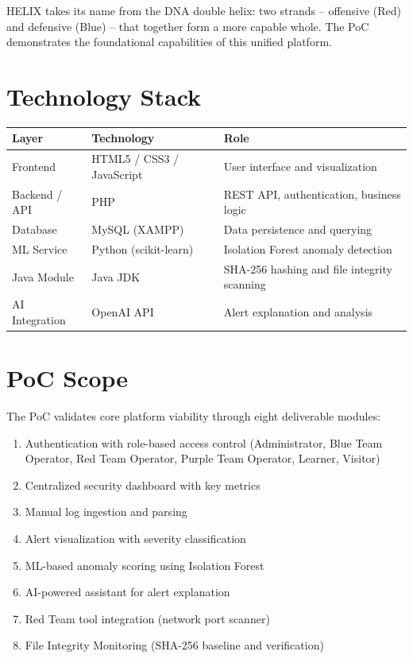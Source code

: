 \documentclass[12pt,a4paper]{report}
\begin{document}
	\vspace{10pt}
	HELIX takes its name from the DNA double helix: two strands -- offensive (Red) and defensive (Blue) -- that together form a more capable whole. The PoC demonstrates the foundational capabilities of this unified platform.
	
	\section{Technology Stack}
	\begin{center}
		\begin{tabular}{L{3.5cm} L{4.5cm} L{5.0cm}}
			\toprule
			\textbf{Layer} & \textbf{Technology} & \textbf{Role} \\
			\midrule
			Frontend & HTML5 / CSS3 / JavaScript & User interface and visualization \\
			Backend / API & PHP & REST API, authentication, business logic \\
			Database & MySQL (XAMPP) & Data persistence and querying \\
			ML Service & Python (scikit-learn) & Isolation Forest anomaly detection \\
 Java Module & Java JDK & SHA-256 hashing and file integrity scanning \\
			AI Integration & OpenAI API & Alert explanation and analysis \\
			\bottomrule
		\end{tabular}
	\end{center}
	
	\section{PoC Scope}
	The PoC validates core platform viability through eight deliverable modules:
	\begin{enumerate}
		\item Authentication with role-based access control (Administrator, Blue Team Operator, Red Team Operator, Purple Team Operator, Learner, Visitor)
		\item Centralized security dashboard with key metrics
		\item Manual log ingestion and parsing
		\item Alert visualization with severity classification
		\item ML-based anomaly scoring using Isolation Forest
		\item AI-powered assistant for alert explanation
		\item Red Team tool integration (network port scanner)
		\item File Integrity Monitoring (SHA-256 baseline and verification)
	\end{enumerate}
	
\end{document}
